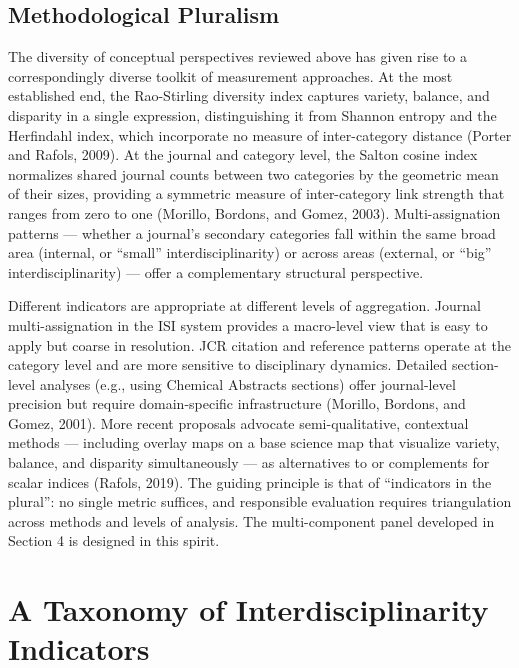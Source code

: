 \documentclass[
]{article}
\begin{document}
\hypertarget{methodological-pluralism}{%
\subsection{Methodological Pluralism}\label{methodological-pluralism}}

The diversity of conceptual perspectives reviewed above has given rise
to a correspondingly diverse toolkit of measurement approaches. At the
most established end, the Rao-Stirling diversity index captures variety,
balance, and disparity in a single expression, distinguishing it from
Shannon entropy and the Herfindahl index, which incorporate no measure
of inter-category distance (Porter and Rafols, 2009). At the journal and
category level, the Salton cosine index normalizes shared journal counts
between two categories by the geometric mean of their sizes, providing a
symmetric measure of inter-category link strength that ranges from zero
to one (Morillo, Bordons, and Gomez, 2003). Multi-assignation patterns
--- whether a journal's secondary categories fall within the same broad
area (internal, or ``small'' interdisciplinarity) or across areas
(external, or ``big'' interdisciplinarity) --- offer a complementary
structural perspective.

Different indicators are appropriate at different levels of aggregation.
Journal multi-assignation in the ISI system provides a macro-level view
that is easy to apply but coarse in resolution. JCR citation and
reference patterns operate at the category level and are more sensitive
to disciplinary dynamics. Detailed section-level analyses (e.g., using
Chemical Abstracts sections) offer journal-level precision but require
domain-specific infrastructure (Morillo, Bordons, and Gomez, 2001). More
recent proposals advocate semi-qualitative, contextual methods ---
including overlay maps on a base science map that visualize variety,
balance, and disparity simultaneously --- as alternatives to or
complements for scalar indices (Rafols, 2019). The guiding principle is
that of ``indicators in the plural'': no single metric suffices, and
responsible evaluation requires triangulation across methods and levels
of analysis. The multi-component panel developed in Section 4 is
designed in this spirit.

\hypertarget{a-taxonomy-of-interdisciplinarity-indicators}{%
\section{A Taxonomy of Interdisciplinarity
Indicators}\label{a-taxonomy-of-interdisciplinarity-indicators}}
\end{document}

